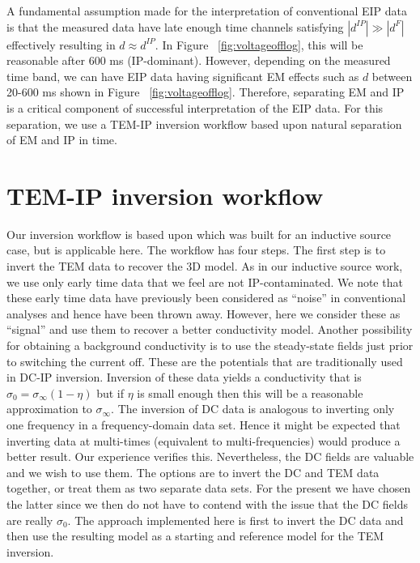 \documentclass[paper]{geophysics}
\newcommand{\siginf}{\sigma_\infty}
\newcommand{\dip}{d^{IP}}
\begin{document}
A fundamental assumption made for the interpretation of conventional EIP data is that the measured data have late enough time channels satisfying $|\dip| \gg |d^F|$  effectively resulting in $d \approx \dip$. In Figure ~\ref{fig:voltageofflog}, this will be reasonable after 600 ms (IP-dominant). However, depending on the measured time band, we can have EIP data having significant EM effects such as $d$ between 20-600 ms shown in Figure ~\ref{fig:voltageofflog}. Therefore, separating EM and IP is a critical component of successful interpretation of the EIP data. For this separation, we use a TEM-IP inversion workflow based upon natural separation of EM and IP in time.




\section{TEM-IP inversion workflow}
Our inversion workflow is based upon \cite{Kang2016} which was built for an inductive source case, but is applicable here. The workflow has four steps. The first step is to invert the TEM data to recover the 3D model. As in our inductive source work, we use only early time data that we feel are not IP-contaminated. We note that these early time data have previously been considered as “noise” in conventional analyses and hence have been thrown away. However, here we consider these as “signal” and use them to recover a better conductivity model. Another possibility for obtaining a background conductivity is to use the steady-state fields just prior to switching the current off. These are the potentials that are traditionally used in DC-IP inversion. Inversion of these data yields a conductivity that is  $\sigma_0 = \siginf (1-\eta)$ but if $\eta$ is small enough then this will be a reasonable approximation to $\siginf$. The inversion of DC data is analogous to inverting only one frequency in a frequency-domain data set. Hence it might be expected that inverting data at multi-times (equivalent to multi-frequencies) would produce a better result. Our experience verifies this. Nevertheless, the DC fields are valuable and we wish to use them. The options are to invert the DC and TEM data together, or treat them as two separate data sets. For the present we have chosen the latter since we then do not have to contend with the issue that the DC fields are really $\sigma_0$. The approach implemented here is first to invert the DC data and then use the resulting model as a starting and reference model for the TEM inversion.
\end{document}
